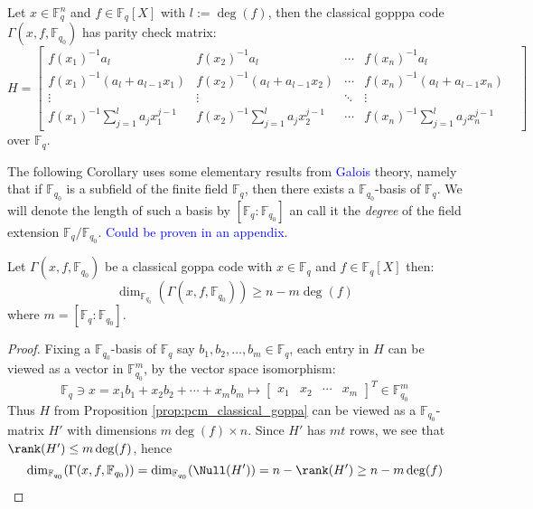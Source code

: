 \begin{proposition}\label{prop:pcm_classical_goppa}
  Let $x \in \mathbb{F}_q^n$ and $f \in \mathbb{F}_q[X]$ with $l := \deg(f)$, then the classical gopppa code $\Gamma(x, f, \mathbb{F}_{q_0})$ has parity check matrix:
  \begin{equation*}
    H = \begin{bmatrix}
          f(x_{1})^{-1} a_{l} & f(x_{2})^{-1} a_{l} & \cdots & f(x_{n})^{-1} a_{l} \\
          f(x_{1})^{-1} (a_{l} + a_{l - 1}x_1) & f(x_{2})^{-1} (a_{l} + a_{l - 1}x_2) & \cdots & f(x_{n})^{-1} (a_{l} + a_{l - 1}x_n) \\
          \vdots & \vdots & \ddots & \vdots \\
          f(x_{1})^{-1} \sum_{j = 1}^l a_j x_1^{j -  1} & f(x_{2})^{-1} \sum_{j = 1}^l a_j x_2^{j -  1} & \cdots & f(x_{n})^{-1} \sum_{j = 1}^l a_j x_n^{j -  1} &
        \end{bmatrix}
  \end{equation*}
  over $\mathbb{F}_q$.
\end{proposition}
The following Corollary uses some elementary results from \textcolor{blue}{Galois} theory, namely that if $\mathbb{F}_{q_0}$ is a subfield of the finite field $\mathbb{F}_q$, then there exists a $\mathbb{F}_{q_0}$-basis of $\mathbb{F}_q$. We will denote the length of such a basis by $[\mathbb{F}_q : \mathbb{F}_{q_0}]$ an call it the \textit{degree} of the field extension $\mathbb{F}_q / \mathbb{F}_{q_0}$. \textcolor{blue}{Could be proven in an appendix.}
\begin{corollary}
  Let $\Gamma(x, f, \mathbb{F}_{q_0})$ be a classical goppa code with $x \in \mathbb{F}_q$ and $f \in \mathbb{F}_q[X]$ then:
  \begin{equation*}
    \dim_{\mathbb{F}_{q_0}}(\Gamma(x, f, \mathbb{F}_{q_0})) \geq n - m \deg(f)
  \end{equation*}
  where $m = [\mathbb{F}_q : \mathbb{F}_{q_0}]$.
\end{corollary}
\begin{proof}
  Fixing a $\mathbb{F}_{q_0}$-basis of $\mathbb{F}_q$ say $b_1, b_2, \ldots, b_{m} \in \mathbb{F}_q$, each entry in $H$ can be viewed as a vector in $\mathbb{F}_{q_0}^m$, by the vector space isomorphism:
  \begin{equation*}
  \mathbb{F}_q \ni x =  x_1 b_1 + x_2 b_2 + \cdots + x_m b_m \mapsto \begin{bmatrix} x_1 & x_2 & \cdots & x_{m} \end{bmatrix}^{T} \in \mathbb{F}_{q_0}^m
  \end{equation*}
  Thus $H$ from Proposition \ref{prop:pcm_classical_goppa} can be viewed as a $\mathbb{F}_{q_0}$-matrix $H'$ with dimensions $m \deg(f) \times n$. Since $H'$ has $mt$ rows, we see that $\rank(H') \leq m \deg(f)$, hence
  \begin{equation*}
    \dim_{\mathbb{F}_{q_0}}(\Gamma(x, f, \mathbb{F}_{q_0})) = \dim_{\mathbb{F}_{q_0}}(\Null(H')) = n - \rank(H') \geq n - m \deg(f) \qedhere
  \end{equation*}
\end{proof}


